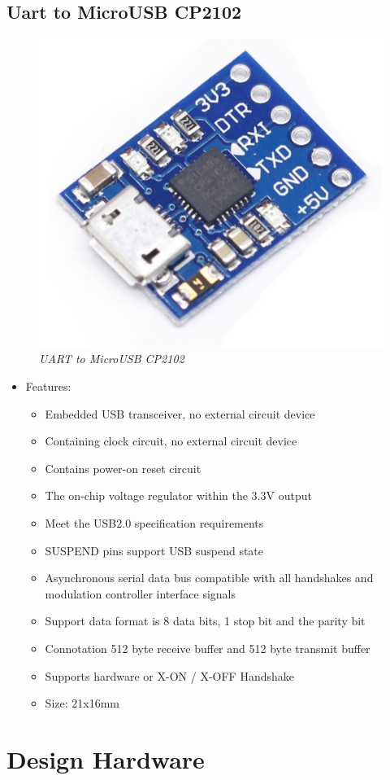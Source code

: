 \documentclass[D:/Latex/Internship/Report/Latex/Report.tex]{subfiles}
\begin{document}
		\subsection{Uart to MicroUSB CP2102}
			\begin{figure}[!ht]
				\centering
				\includegraphics[width = 0.5\linewidth]{Figure/CP2102.pdf}
				\caption{\it UART to MicroUSB CP2102}
			\end{figure}
			\begin{itemize}
				\item Features:
					\begin{itemize}
						\item Embedded USB transceiver, no external circuit device
						\item Containing clock circuit, no external circuit device
						\item Contains power-on reset circuit
						\item The on-chip voltage regulator within the 3.3V output
						\item Meet the USB2.0 specification requirements
						\item SUSPEND pins support USB suspend state
						\item Asynchronous serial data bus compatible with all handshakes and modulation controller interface signals
						\item Support data format is 8 data bits, 1 stop bit and the parity bit
						\item Connotation 512 byte receive buffer and 512 byte transmit buffer
						\item Supports hardware or X-ON / X-OFF Handshake
						\item Size: 21x16mm
					\end{itemize}
			\end{itemize}


		\section{Design Hardware}
\end{document}

